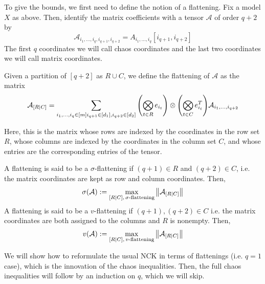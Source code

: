 To give the bounds, we first need to define
the notion of a flattening. Fix a model $X$ as above.
Then, identify the matrix coefficients with a tensor $\mathcal{A}$ of order $q + 2$ by
\[ \mathcal{A}_{i_1, \dots, i_q, i_{q + 1}, i_{q + 2}} = A_{i_1, \dots, i_q}[i_{q + 1}, i_{q + 2}] \]
The first $q$ coordinates we will call chaos coordinates and the last two coordinates we will call matrix coordinates.
\begin{definition}
    Given a partition of $[q + 2]$ as $R \cup C$, we define the flattening of $\mathcal{A}$ as the matrix
    \[ \mathcal{A}_{[R \mid C]} = \sum_{\substack{i_1, \dots, i_q \in [m]}\\
    i_{q + 1} \in [d_1], i_{q + 2} \in [d_2]} \qty(\bigotimes_{ t\in R} e_{i_t}) \otimes \qty(\bigotimes_{t \in C} e_{i_t}^T) \mathcal{A}_{i_1, \dots, i_{q + 2}}\]
\end{definition}
Here, this is the matrix whose rows are indexed by the coordinates in the row set $R$, whose columns
are indexed by the coordinates in the column set $C$, and whose entries are the corresponding entries of the tensor.
\begin{definition}
    A flattening is said to be a $\sigma$-flattening if $(q + 1) \in R$ and $(q + 2) \in C$,
    i.e. the matrix coordinates are kept as row and column coordinates. Then,
    \[ \sigma(\mathcal{A}) := \max_{[R\mid C], \, \sigma\text{-flattening}} \norm{\mathcal{A}_{[R \mid C]}} \]
    A flattening is said to be a $v$-flattening if $(q + 1), (q + 2) \in C$ i.e. the matrix coordinates are both assigned to the columns and $R$ is nonempty.
    Then,
    \[ v(\mathcal{A}) := \max_{[R\mid C], \, v\text{-flattening}} \norm{\mathcal{A}_{[R \mid C]}}  \]
\end{definition}
We will show how to reformulate the usual NCK in terms of flattenings (i.e. $q = 1$ case),
which is the innovation of the chaos inequalities. Then, the full chaos inequalities will follow by an induction
on $q$, which we will skip.

